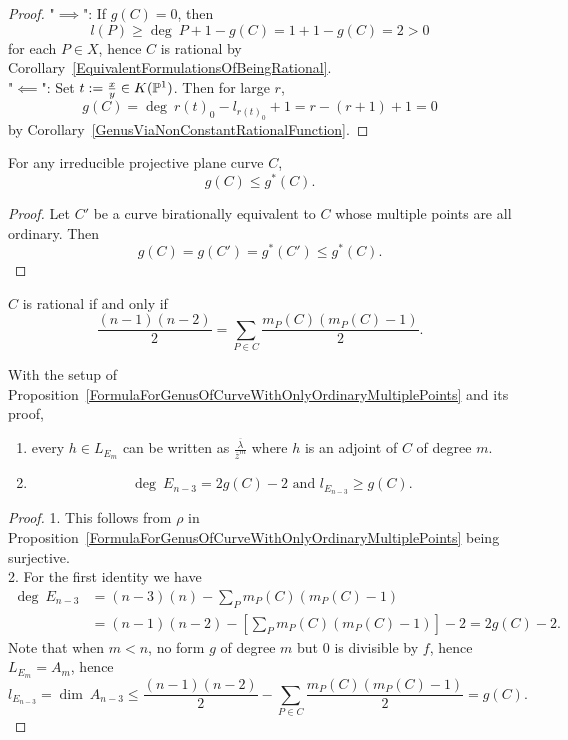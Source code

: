     \begin{proof}
        "$\implies$": If $g(C)=0$, then 
        $$
            l(P) \geq \deg \ P+1-g(C) = 1+1-g(C)=2>0
        $$
        for each $P\in X$, hence $C$ is rational by Corollary~\ref{EquivalentFormulationsOfBeingRational}.
        \\
        "$\impliedby$": Set $t := \frac{x}{y}\in K(\mathbb{P}^1)$. Then for large $r$, 
        $$
            g(C) = \deg\ r(t)_0 - l_{r(t)_0}+1 = r -(r+1)+1=0
        $$
        by Corollary~\ref{GenusViaNonConstantRationalFunction}.
    \end{proof}
    \begin{corollary}
        For any irreducible projective plane curve $C$,
        $$
            g(C) \leq g^\ast(C).
        $$
    \end{corollary}
    \begin{proof}
        Let $C'$ be a curve birationally equivalent to $C$ whose multiple points are all ordinary. Then 
        $$
            g(C) = g(C') = g^\ast(C') \leq g^\ast(C).
        $$
    \end{proof}
    \begin{corollary}
        $C$ is rational if and only if 
        $$
            \frac{(n-1)(n-2)}{2} = \sum_{P\in C} \frac{m_P(C)(m_P(C)-1)}{2}.
        $$
    \end{corollary}
    \begin{corollary}\label{DegreeOfCanonicalDivisorComputation}
        With the setup of Proposition~\ref{FormulaForGenusOfCurveWithOnlyOrdinaryMultiplePoints} and its proof,
        \begin{enumerate}
            \item every $h\in L_{E_m}$ can be written as $\frac{\overline{\lambda}}{\overline{z}^m}$ where $h$ is an adjoint of $C$ of degree $m$.
            \item 
            $$
                \deg \ E_{n-3} = 2g(C)-2 \text{ and } l_{E_{n-3}}\geq g(C).
            $$
        \end{enumerate}
    \end{corollary}
    \begin{proof}
        1. This follows from $\rho$ in Proposition~\ref{FormulaForGenusOfCurveWithOnlyOrdinaryMultiplePoints} being surjective.\\
        2. For the first identity we have 
        \begin{align*}
            \deg \ E_{n-3} &= (n-3)(n)-\sum_P m_P(C)(m_P(C)-1)\\ 
            &= (n-1)(n-2)-\left[\sum_P m_P(C)(m_P(C)-1)\right]-2 = 2g(C)-2.
        \end{align*}
        Note that when $m<n$, no form $g$ of degree $m$ but $0$ is divisible by $f$, hence $L_{E_m} = A_m$, hence 
        $$
            l_{E_{n-3}} = \dim \ A_{n-3} \leq \frac{(n-1)(n-2)}{2}-\sum_{P\in C} \frac{m_P(C)(m_P(C)-1)}{2} = g(C).
        $$
    \end{proof}

